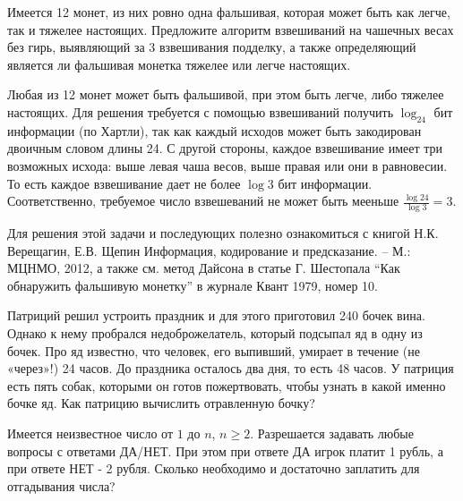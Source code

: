 \begin{problem}
Имеется 12 монет, из них ровно одна фальшивая, которая может быть как легче, так и тяжелее настоящих.   Предложите алгоритм взвешиваний на чашечных весах без гирь, выявляющий за 3 взвешивания подделку, а также определяющий является ли фальшивая монетка тяжелее или легче настоящих.
\begin{ordre}
Любая из 12 монет может быть фальшивой, при этом быть легче, либо тяжелее настоящих. Для решения требуется с помощью взвешиваний  получить $\log_24$ бит информации (по Хартли), так как каждый  исходов может быть закодирован двоичным словом длины 24. С другой стороны, каждое взвешивание имеет три возможных исхода: выше левая чаша весов, выше правая или они в равновесии. То есть каждое взвешивание дает не более $\log3$ бит информации. Соответственно, требуемое число взвешеваний не может быть мееньше $\frac{\log24}{\log3} = 3$. 

Для решения этой задачи и последующих полезно ознакомиться с книгой Н.К. Верещагин, Е.В. Щепин Информация, кодирование и предсказание. -- М.:  МЦНМО, 2012, а также см. метод Дайсона в статье Г. Шестопала ``Как обнаружить фальшивую монетку'' в журнале Квант 1979, номер 10.
\end{ordre}
\end{problem}

\begin{problem}
Патриций решил устроить праздник и для этого приготовил 240 бочек вина. Однако к нему пробрался недоброжелатель, который подсыпал яд в одну из бочек. Про яд известно, что человек, его выпивший, умирает в течение (не «через»!) 24 часов. До праздника осталось два дня, то есть 48 часов. У патриция есть пять собак, которыми он готов пожертвовать, чтобы узнать в какой именно бочке яд.
Как патрицию вычислить отравленную бочку?
\end{problem}

\begin{problem} Имеется неизвестное число от $1$ до $n$, $n \geq 2$. Разрешается задавать любые вопросы с ответами ДА/НЕТ. При этом при ответе ДА игрок платит 1 рубль, а при ответе НЕТ - 2 рубля. Сколько необходимо и достаточно заплатить для отгадывания числа?
\end{problem}


